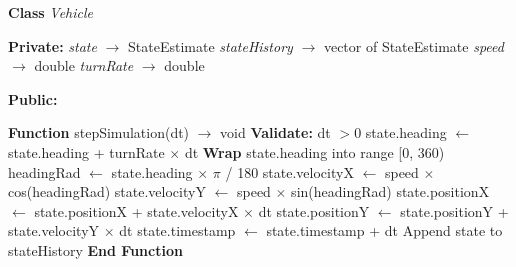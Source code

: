 \documentclass[a4paper,11pt]{article}
\begin{document}
\begin{algorithm}[H]
\caption{Vehicle   Step Simulation, Predict, Update, and Display}
\begin{algorithmic}[1]

\State \textbf{Class} \textit{Vehicle}

\State \hspace{0.5cm} \textbf{Private:}
\State \hspace{1cm} \textit{state} $\rightarrow$ StateEstimate
\State \hspace{1cm} \textit{stateHistory} $\rightarrow$ vector of StateEstimate
\State \hspace{1cm} \textit{speed} $\rightarrow$ double
\State \hspace{1cm} \textit{turnRate} $\rightarrow$ double

\State \hspace{0.5cm} \textbf{Public:}

\State \hspace{1cm} \textbf{Function} stepSimulation(dt) $\rightarrow$ void
\State \hspace{1.5cm} \textbf{Validate:} dt $> 0$
\State \hspace{1.5cm} state.heading $\leftarrow$ state.heading + turnRate $\times$ dt
\State \hspace{1.5cm} \textbf{Wrap} state.heading into range [0, 360)
\State \hspace{1.5cm} headingRad $\leftarrow$ state.heading $\times$ $\pi$ / 180
\State \hspace{1.5cm} state.velocityX $\leftarrow$ speed $\times$ cos(headingRad)
\State \hspace{1.5cm} state.velocityY $\leftarrow$ speed $\times$ sin(headingRad)
\State \hspace{1.5cm} state.positionX $\leftarrow$ state.positionX + state.velocityX $\times$ dt
\State \hspace{1.5cm} state.positionY $\leftarrow$ state.positionY + state.velocityY $\times$ dt
\State \hspace{1.5cm} state.timestamp $\leftarrow$ state.timestamp + dt
\State \hspace{1.5cm} Append state to stateHistory
\State \hspace{1cm} \textbf{End Function}

\vspace{0.3cm}


\end{algorithmic}
\end{algorithm}
\end{document}
